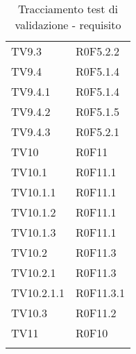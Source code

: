 \documentclass[PianoDiQualifica.tex]{subfiles}
\begin{document}
\begin{longtable}[H]{P{6.5cm}P{7cm}}
	TV9.3 & R0F5.2.2 \\
	TV9.4 & R0F5.1.4 \\
	TV9.4.1 & R0F5.1.4 \\
	TV9.4.2 & R0F5.1.5 \\
	TV9.4.3 & R0F5.2.1 \\
	TV10  & R0F11 \\ 
	TV10.1  & R0F11.1 \\ 
	TV10.1.1  & R0F11.1 \\ 
	TV10.1.2  & R0F11.1 \\ 
	TV10.1.3  & R0F11.1 \\ 
	TV10.2  & R0F11.3 \\ 
	TV10.2.1  & R0F11.3 \\ 
	TV10.2.1.1  & R0F11.3.1 \\ 
	TV10.3  & R0F11.2 \\ 
	TV11  & R0F10 \\ 
	
	\hiderowcolors
	\caption{Tracciamento test di validazione - requisito}
\end{longtable}
\end{document}
